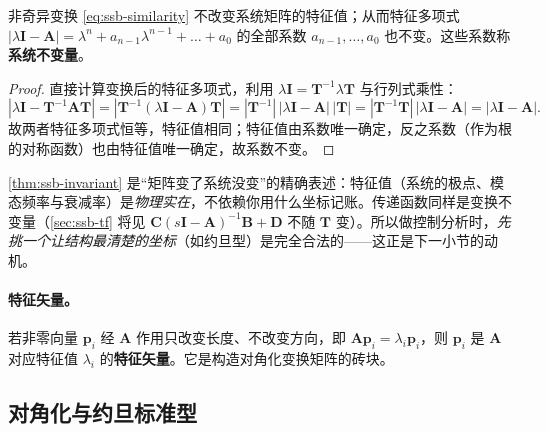 \begin{theorem}[特征值与系统不变量在线性变换下不变]\label{thm:ssb-invariant}
非奇异变换 \cref{eq:ssb-similarity} 不改变系统矩阵的特征值；从而特征多项式 $|\lambda\mathbf{I}-\mathbf{A}|=\lambda^n+a_{n-1}\lambda^{n-1}+\dots+a_0$ 的全部系数 $a_{n-1},\dots,a_0$ 也不变。这些系数称\textbf{系统不变量}。
\end{theorem}
\begin{proof}
直接计算变换后的特征多项式，利用 $\lambda\mathbf{I}=\mathbf{T}^{-1}\lambda\mathbf{T}$ 与行列式乘性：
\[
  |\lambda\mathbf{I}-\mathbf{T}^{-1}\mathbf{A}\mathbf{T}|
  =|\mathbf{T}^{-1}(\lambda\mathbf{I}-\mathbf{A})\mathbf{T}|
  =|\mathbf{T}^{-1}|\,|\lambda\mathbf{I}-\mathbf{A}|\,|\mathbf{T}|
  =|\mathbf{T}^{-1}\mathbf{T}|\,|\lambda\mathbf{I}-\mathbf{A}|
  =|\lambda\mathbf{I}-\mathbf{A}|.
\]
故两者特征多项式恒等，特征值相同；特征值由系数唯一确定，反之系数（作为根的对称函数）也由特征值唯一确定，故系数不变。
\end{proof}

\begin{insight}
\cref{thm:ssb-invariant} 是“矩阵变了系统没变”的精确表述：特征值（系统的极点、模态频率与衰减率）是\emph{物理实在}，不依赖你用什么坐标记账。传递函数同样是变换不变量（\cref{sec:ssb-tf} 将见 $\mathbf{C}(s\mathbf{I}-\mathbf{A})^{-1}\mathbf{B}+\mathbf{D}$ 不随 $\mathbf{T}$ 变）。所以做控制分析时，\emph{先挑一个让结构最清楚的坐标}（如约旦型）是完全合法的——这正是下一小节的动机。
\end{insight}

\paragraph{特征矢量。}
若非零向量 $\mathbf{p}_i$ 经 $\mathbf{A}$ 作用只改变长度、不改变方向，即 $\mathbf{A}\mathbf{p}_i=\lambda_i\mathbf{p}_i$，则 $\mathbf{p}_i$ 是 $\mathbf{A}$ 对应特征值 $\lambda_i$ 的\textbf{特征矢量}。它是构造对角化变换矩阵的砖块。

\subsection{对角化与约旦标准型}
\label{sec:ssb-jordan}

